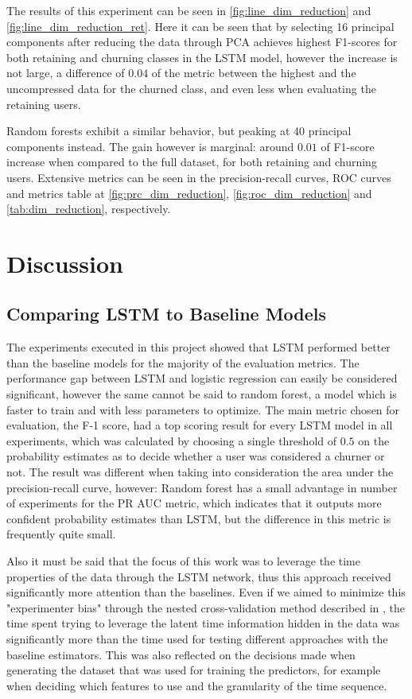 \documentclass{kththesis}
\begin{document}
The results of this experiment can be seen in \autoref{fig:line_dim_reduction} and \autoref{fig:line_dim_reduction_ret}. Here it can be seen that by selecting 16 principal components after reducing the data through PCA achieves highest F1-scores for both retaining and churning classes in the LSTM model, however the increase is not large, a difference of $0.04$ of the metric between the highest and the uncompressed data for the churned class, and even less when evaluating the retaining users.

Random forests exhibit a similar behavior, but peaking at 40 principal components instead. The gain however is marginal: around $0.01$ of F1-score increase when compared to the full dataset, for both retaining and churning users. Extensive metrics can be seen in the precision-recall curves, ROC curves and metrics table at \autoref{fig:prc_dim_reduction}, \autoref{fig:roc_dim_reduction} and \autoref{tab:dim_reduction}, respectively.

\chapter{Discussion}
\label{cha:discussion}

\section{Comparing LSTM to Baseline Models}

The experiments executed in this project showed that LSTM  performed better than the baseline models for the majority of the evaluation metrics. The performance gap between LSTM and logistic regression can easily be considered significant, however the same cannot be said to random forest, a model which is faster to train and with less parameters to optimize. The main metric chosen for evaluation, the F-1 score, had a top scoring result for every LSTM model in all experiments, which was calculated by choosing a single threshold of $0.5$ on the probability estimates as to decide whether a user was considered a churner or not. The result was different when taking into consideration the area under the precision-recall curve, however: Random forest has a small advantage in number of experiments for the PR AUC metric, which indicates that it outputs more confident probability estimates than LSTM, but the difference in this metric is frequently quite small. 

Also it must be said that the focus of this work was to leverage the time properties of the data through the LSTM network, thus this approach received significantly more attention than the baselines. Even if we aimed to minimize this "experimenter bias" through the nested cross-validation method described in , the time spent trying to leverage the latent time information hidden in the data was significantly more than the time used for testing different approaches with the baseline estimators. This was also reflected on the decisions made when generating the dataset that was used for training the predictors, for example when deciding which features to use and the granularity of the time sequence. 
\end{document}
